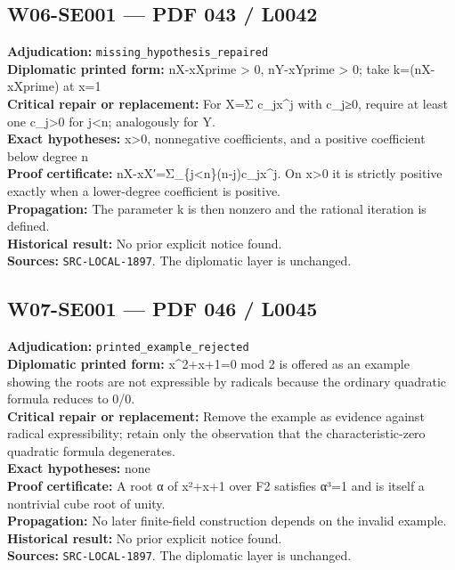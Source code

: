 \documentclass[
  10pt,
  a4paper,
]{scrreprt}
\begin{document}
\subsection{W06-SE001 --- PDF 043 /
L0042}\label{w06-se001-pdf-043-l0042}

\textbf{Adjudication:} \texttt{missing\_hypothesis\_repaired}\\
\textbf{Diplomatic printed form:} nX-xXprime \textgreater{} 0,
nY-xYprime \textgreater{} 0; take k=(nX-xXprime) at x=1\\
\textbf{Critical repair or replacement:} For X=Σ c\_jx\^{}j with c\_j≥0,
require at least one c\_j\textgreater0 for j\textless n; analogously for
Y.\\
\textbf{Exact hypotheses:} x\textgreater0, nonnegative coefficients, and
a positive coefficient below degree n\\
\textbf{Proof certificate:} nX-xX′=Σ\_\{j\textless n\}(n-j)c\_jx\^{}j.
On x\textgreater0 it is strictly positive exactly when a lower-degree
coefficient is positive.\\
\textbf{Propagation:} The parameter k is then nonzero and the rational
iteration is defined.\\
\textbf{Historical result:} No prior explicit notice found.\\
\textbf{Sources:} \texttt{SRC-LOCAL-1897}. The diplomatic layer is
unchanged.

\subsection{W07-SE001 --- PDF 046 /
L0045}\label{w07-se001-pdf-046-l0045}

\textbf{Adjudication:} \texttt{printed\_example\_rejected}\\
\textbf{Diplomatic printed form:} x\^{}2+x+1=0 mod 2 is offered as an
example showing the roots are not expressible by radicals because the
ordinary quadratic formula reduces to 0/0.\\
\textbf{Critical repair or replacement:} Remove the example as evidence
against radical expressibility; retain only the observation that the
characteristic-zero quadratic formula degenerates.\\
\textbf{Exact hypotheses:} none\\
\textbf{Proof certificate:} A root α of x²+x+1 over F2 satisfies α³=1
and is itself a nontrivial cube root of unity.\\
\textbf{Propagation:} No later finite-field construction depends on the
invalid example.\\
\textbf{Historical result:} No prior explicit notice found.\\
\textbf{Sources:} \texttt{SRC-LOCAL-1897}. The diplomatic layer is
unchanged.
\end{document}
